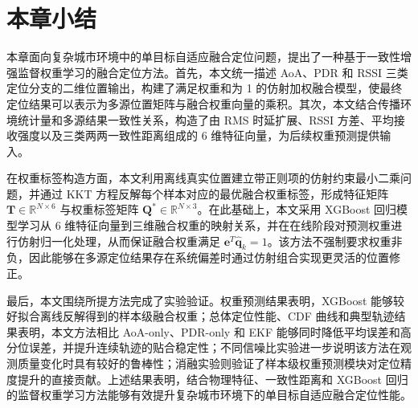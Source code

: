 \section{本章小结}
\label{sec:3_7}

本章面向复杂城市环境中的单目标自适应融合定位问题，提出了一种基于一致性增强监督权重学习的融合定位方法。首先，本文统一描述 AoA、PDR 和 RSSI 三类定位分支的二维位置输出，构建了满足权重和为 1 的仿射加权融合模型，使最终定位结果可以表示为多源位置矩阵与融合权重向量的乘积。其次，本文结合传播环境统计量和多源结果一致性关系，构造了由 RMS 时延扩展、RSSI 方差、平均接收强度以及三类两两一致性距离组成的 6 维特征向量，为后续权重预测提供输入。

在权重标签构造方面，本文利用离线真实位置建立带正则项的仿射约束最小二乘问题，并通过 KKT 方程反解每个样本对应的最优融合权重标签，形成特征矩阵 \(\mathbf{T}\in\mathbb{R}^{N\times6}\) 与权重标签矩阵 \(\mathbf{Q}^{*}\in\mathbb{R}^{N\times3}\)。在此基础上，本文采用 XGBoost 回归模型学习从 6 维特征向量到三维融合权重的映射关系，并在在线阶段对预测权重进行仿射归一化处理，从而保证融合权重满足 \(\mathbf{e}^{T}\hat{\mathbf{q}}_k=1\)。该方法不强制要求权重非负，因此能够在多源定位结果存在系统偏差时通过仿射组合实现更灵活的位置修正。

最后，本文围绕所提方法完成了实验验证。权重预测结果表明，XGBoost 能够较好拟合离线反解得到的样本级融合权重；总体定位性能、CDF 曲线和典型轨迹结果表明，本文方法相比 AoA-only、PDR-only 和 EKF 能够同时降低平均误差和高分位误差，并提升连续轨迹的贴合稳定性；不同信噪比实验进一步说明该方法在观测质量变化时具有较好的鲁棒性；消融实验则验证了样本级权重预测模块对定位精度提升的直接贡献。上述结果表明，结合物理特征、一致性距离和 XGBoost 回归的监督权重学习方法能够有效提升复杂城市环境下的单目标自适应融合定位性能。
